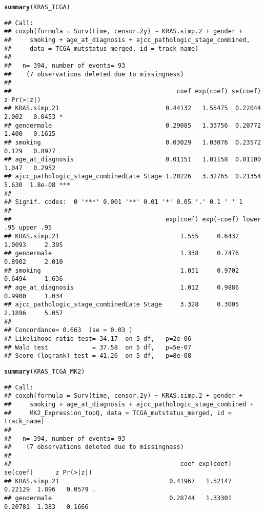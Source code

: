 \documentclass{article}\usepackage[]{graphicx}\usepackage[]{color}
\makeatletter
\newcommand{\hlstd}[1]{\textcolor[rgb]{0.345,0.345,0.345}{#1}}%
\newcommand{\hlkwd}[1]{\textcolor[rgb]{0.737,0.353,0.396}{\textbf{#1}}}%
\newenvironment{kframe}{%
 \def\at@end@of@kframe{}%
 \ifinner\ifhmode%
  \def\at@end@of@kframe{\end{minipage}}%
  \begin{minipage}{\columnwidth}%
 \fi\fi%
 \def\FrameCommand##1{\hskip\@totalleftmargin \hskip-\fboxsep
 \colorbox{shadecolor}{##1}\hskip-\fboxsep
     \hskip-\linewidth \hskip-\@totalleftmargin \hskip\columnwidth}%
 \MakeFramed {\advance\hsize-\width
   \@totalleftmargin\z@ \linewidth\hsize
   \@setminipage}}%
 {\par\unskip\endMakeFramed%
 \at@end@of@kframe}
\newenvironment{knitrout}{}{} %
\makeatother
\begin{document}
\begin{knitrout}
\begin{kframe}
\begin{alltt}
\hlkwd{summary}\hlstd{(KRAS_TCGA)}
\end{alltt}
\begin{verbatim}
## Call:
## coxph(formula = Surv(time, censor.2y) ~ KRAS.simp.2 + gender + 
##     smoking + age_at_diagnosis + ajcc_pathologic_stage_combined, 
##     data = TCGA_mutstatus_merged, id = track_name)
## 
##   n= 394, number of events= 93 
##    (7 observations deleted due to missingness)
## 
##                                             coef exp(coef) se(coef)     z Pr(>|z|)    
## KRAS.simp.21                             0.44132   1.55475  0.22044 2.002   0.0453 *  
## gendermale                               0.29085   1.33756  0.20772 1.400   0.1615    
## smoking                                  0.03029   1.03076  0.23572 0.129   0.8977    
## age_at_diagnosis                         0.01151   1.01158  0.01100 1.047   0.2952    
## ajcc_pathologic_stage_combinedLate Stage 1.20226   3.32765  0.21354 5.630  1.8e-08 ***
## ---
## Signif. codes:  0 '***' 0.001 '**' 0.01 '*' 0.05 '.' 0.1 ' ' 1
## 
##                                          exp(coef) exp(-coef) lower .95 upper .95
## KRAS.simp.21                                 1.555     0.6432    1.0093     2.395
## gendermale                                   1.338     0.7476    0.8902     2.010
## smoking                                      1.031     0.9702    0.6494     1.636
## age_at_diagnosis                             1.012     0.9886    0.9900     1.034
## ajcc_pathologic_stage_combinedLate Stage     3.328     0.3005    2.1896     5.057
## 
## Concordance= 0.663  (se = 0.03 )
## Likelihood ratio test= 34.17  on 5 df,   p=2e-06
## Wald test            = 37.58  on 5 df,   p=5e-07
## Score (logrank) test = 41.26  on 5 df,   p=8e-08
\end{verbatim}
\begin{alltt}
\hlkwd{summary}\hlstd{(KRAS_TCGA_MK2)}
\end{alltt}
\begin{verbatim}
## Call:
## coxph(formula = Surv(time, censor.2y) ~ KRAS.simp.2 + gender + 
##     smoking + age_at_diagnosis + ajcc_pathologic_stage_combined + 
##     MK2_Expression_topQ, data = TCGA_mutstatus_merged, id = track_name)
## 
##   n= 394, number of events= 93 
##    (7 observations deleted due to missingness)
## 
##                                              coef exp(coef) se(coef)      z Pr(>|z|)    
## KRAS.simp.21                              0.41967   1.52147  0.22129  1.896   0.0579 .  
## gendermale                                0.28744   1.33301  0.20781  1.383   0.1666    

\end{verbatim}
\end{kframe}
\end{knitrout}
\end{document}
